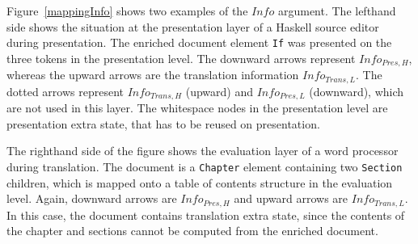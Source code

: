 Figure~\ref{mappingInfo} shows two examples of the $Info$ argument. The lefthand side shows the situation at the presentation layer of a Haskell source editor during presentation.  The enriched document element \verb|If|  was presented on the three tokens in the presentation level. The downward arrows represent $Info_{Pres,H}$, whereas the upward arrows are the translation information $Info_{Trans, L}$. The dotted arrows represent $Info_{Trans,H}$ (upward) and $Info_{Pres,L}$ (downward), which are not used in this layer. The whitespace nodes in the presentation level are presentation extra state, that has to be reused on presentation. 

The righthand side of the figure shows the evaluation layer of a word processor during translation. The document is a \verb|Chapter| element containing two \verb|Section| children, which is mapped onto a table of contents structure in the evaluation level. Again, downward arrows are $Info_{Pres,H}$ and upward arrows are $Info_{Trans,L}$.  In this case, the document contains translation extra state, since the contents of the chapter and sections cannot be computed from the enriched document.  

